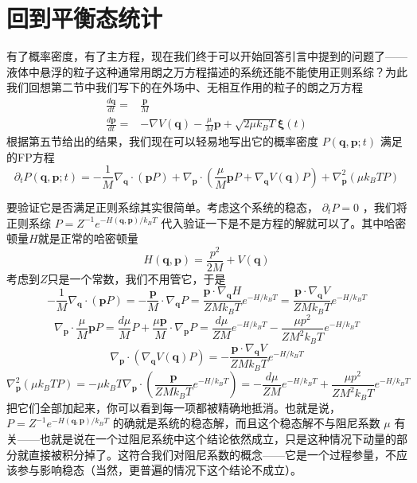\documentclass{ctexart}
\begin{document}
\section{回到平衡态统计}
有了概率密度，有了主方程，现在我们终于可以开始回答引言中提到的问题了——液体中悬浮的粒子这种通常用朗之万方程描述的系统还能不能使用正则系综？为此我们回想第二节中我们写下的在外场中、无相互作用的粒子的朗之万方程
\begin{align} 
\frac{d\bm{q}}{dt}=&\frac{\bm{p}}{M}\\ 
\frac{d\bm{p}}{dt}=&-\nabla V(\bm{q})-\frac{\mu}{M}\bm{p}+\sqrt{2\mu k_BT}\bm{\xi}(t) 
\end{align}
根据第五节给出的结果，我们现在可以轻易地写出它的概率密度 $P(\bm{q},\bm{p};t)$ 满足的FP方程
\begin{equation}
\partial_t P(\bm{q},\bm{p};t)=-\frac{1}{M}\nabla_{\bm{q}}\cdot(\bm{p}P)+\nabla_{\bm{p}}\cdot\left(\frac{\mu}{M}\bm{p}P+\nabla_{\bm{q}}V(\bm{q})P\right)+\nabla^2_{\bm{p}}(\mu k_BTP)
\end{equation}

要验证它是否满足正则系综其实很简单。考虑这个系统的稳态， $\partial_tP=0$ ，我们将正则系综 $P=Z^{-1}e^{-H(\bm{q},\bm{p})/k_BT}$ 代入验证一下是不是方程的解就可以了。其中哈密顿量$H$就是正常的哈密顿量
\begin{equation}
H(\bm{q},\bm{p})=\frac{p^2}{2M}+V(\bm{q})
\end{equation}
考虑到$Z$只是一个常数，我们不用管它，于是
\begin{equation}
-\frac{1}{M}\nabla_{\bm{q}}\cdot(\bm{p}P)=-\frac{\bm{p}}{M}\cdot\nabla_{\bm{q}}P=\frac{\bm{p}\cdot\nabla_{\bm{q}}H}{ZMk_BT}e^{-H/k_BT}=\frac{\bm{p}\cdot\nabla_{\bm{q}}V}{ZMk_BT}e^{-H/k_BT}
\end{equation}
\begin{equation}
\nabla_{\bm{p}}\cdot\frac{\mu}{M}\bm{p}P=\frac{d\mu}{M}P+\frac{\mu\bm{p}}{M}\cdot\nabla_{\bm{p}}P=\frac{d\mu}{ZM}e^{-H/k_BT}-\frac{\mu p^2}{ZM^2k_BT}e^{-H/k_BT}
\end{equation}
\begin{equation}
\nabla_{\bm{p}}\cdot(\nabla_{\bm{q}}V(\bm{q})P)=-\frac{\bm{p}\cdot\nabla_{\bm{q}}V}{ZMk_BT}e^{-H/k_BT}
\end{equation}
\begin{equation}
\nabla^2_{\bm{p}}(\mu k_BTP)=-\mu k_BT\nabla_{\bm{p}}\cdot(\frac{\bm{p}}{ZMk_B T}e^{-H/k_BT})=-\frac{d\mu}{ZM}e^{-H/k_BT}+\frac{\mu p^2}{ZM^2k_BT}e^{-H/k_BT}
\end{equation}
把它们全部加起来，你可以看到每一项都被精确地抵消。也就是说，$P=Z^{-1}e^{-H(\bm{q},\bm{p})/k_BT}$ 的确就是系统的稳态解，而且这个稳态解不与阻尼系数 $\mu$ 有关——也就是说在一个过阻尼系统中这个结论依然成立，只是这种情况下动量的部分就直接被积分掉了。这符合我们对阻尼系数的概念——它是一个过程参量，不应该参与影响稳态（当然，更普遍的情况下这个结论不成立）。
\end{document}
